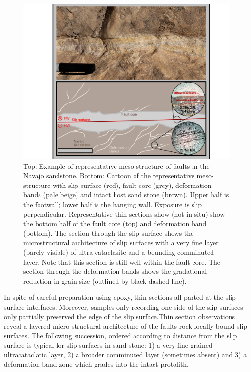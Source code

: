 \documentclass[12pt,a4paper]{article}
\begin{document}
 \begin{figure}[h]
	\centering
		\includegraphics[width=1 \textwidth]{Fault_architecture_zoom}
	\caption{Top: Example of representative meso-structure of faults in the Navajo sandstone. Bottom: Cartoon of the representative meso-structure with slip surface (red), fault core (grey), deformation bands (pale beige) and intact host sand stone (brown). Upper half is the footwall; lower half is the hanging wall. Exposure is slip perpendicular. Representative thin sections show (not in situ) show the bottom half of the fault core (top) and deformation band (bottom). The section through the slip surface shows the microstructural architecture of slip surfaces with a very fine layer (barely visible) of ultra-cataclasite and a bounding comminuted layer. Note that this section is still well within the fault core. The section through the deformation bands shows the gradational reduction in grain size (outlined by black dashed line).}
	\label{DBC}
\end{figure}

In spite of careful preparation using epoxy, thin sections all parted at the slip surface interfaces. Moreover, samples only recording one side of the slip surfaces only partially preserved the edge of the slip surface.Thin section observations reveal a layered micro-structural architecture of the faults rock locally bound slip surfaces. The following succession, ordered according to distance from the slip surface is typical for slip surfaces in sand stone:  1) a very fine grained ultracataclatic layer, 2) a broader comminuted layer (sometimes absent) and 3) a deformation band zone which grades into the intact protolith.
\end{document}
